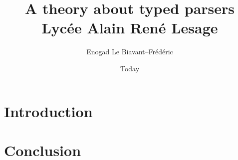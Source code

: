 \documentclass{report}
\title{
		{\Huge A theory about typed parsers}\\
		{\large Lycée Alain René Lesage}\\
}
\author{Enogad Le Biavant--Frédéric}
\date{Today}
\begin{document}
\maketitle
\tableofcontents
\chapter{Introduction}


\chapter{Conclusion}
%
\end{document}
